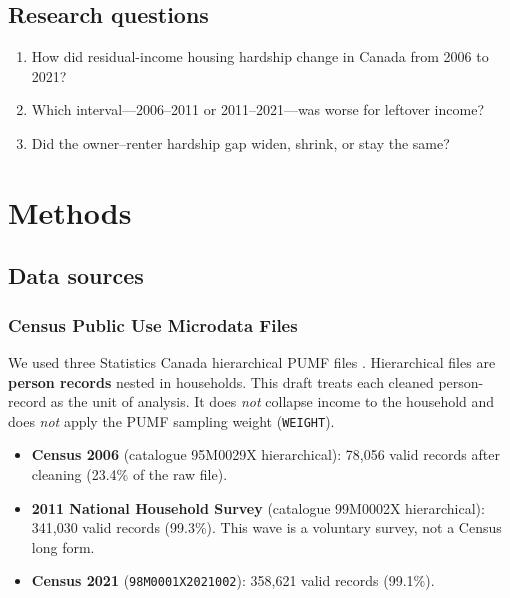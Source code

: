 \documentclass[11pt,letterpaper]{article}
\begin{document}
\subsection{Research questions}
\label{sec:rq}

\begin{enumerate}[leftmargin=1.6em]
  \item How did residual-income housing hardship change in Canada from 2006 to 2021?
  \item Which interval---2006--2011 or 2011--2021---was worse for leftover income?
  \item Did the owner--renter hardship gap widen, shrink, or stay the same?
\end{enumerate}

\section{Methods}
\label{sec:methods}

\subsection{Data sources}
\label{sec:data}

\subsubsection{Census Public Use Microdata Files}

We used three Statistics Canada hierarchical PUMF files \cite{statcan2022pumf}.
Hierarchical files are \textbf{person records} nested in households.
This draft treats each cleaned person-record as the unit of analysis.
It does \emph{not} collapse income to the household and does \emph{not} apply the PUMF sampling weight (\texttt{WEIGHT}).

\begin{itemize}[leftmargin=1.4em]
  \item \textbf{Census 2006} (catalogue 95M0029X hierarchical): 78,056 valid records after cleaning (23.4\% of the raw file).
  \item \textbf{2011 National Household Survey} (catalogue 99M0002X hierarchical): 341,030 valid records (99.3\%). This wave is a voluntary survey, not a Census long form.
  \item \textbf{Census 2021} (\texttt{98M0001X2021002}): 358,621 valid records (99.1\%).
\end{itemize}
\end{document}
